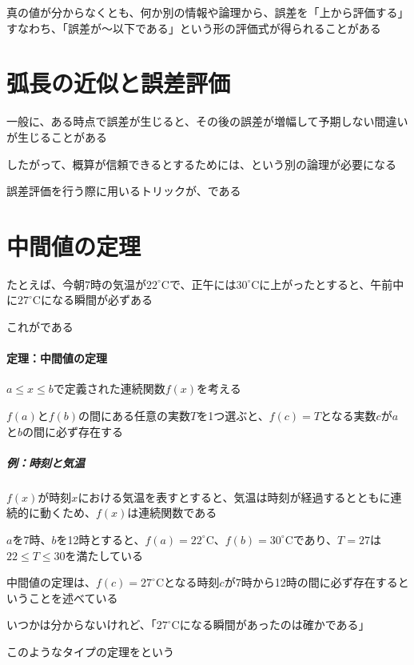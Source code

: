\documentclass[../book_jiriki_calc]{subfiles}
\begin{document}
\sectionline

真の値が分からなくとも、何か別の情報や論理から、誤差を「上から評価する」すなわち、「誤差が〜以下である」という形の評価式が得られることがある

\section{弧長の近似と誤差評価}

一般に、ある時点で誤差が生じると、その後の誤差が増幅して予期しない間違いが生じることがある

したがって、概算が信頼できるとするためには、という別の論理が必要になる

誤差評価を行う際に用いるトリックが、である

\section{中間値の定理}

たとえば、今朝7時の気温が$22^\circ$Cで、正午には$30^\circ$Cに上がったとすると、午前中に$27^\circ$Cになる瞬間が必ずある

これがである

\sectionline

\paragraph{定理：中間値の定理}

$a \leq x \leq b$で定義された連続関数$f(x)$を考える

$f(a)$と$f(b)$の間にある任意の実数$T$を1つ選ぶと、$f(c)=T$となる実数$c$が$a$と$b$の間に必ず存在する

\sectionline

\subparagraph{例：時刻と気温}

$f(x)$が時刻$x$における気温を表すとすると、気温は時刻が経過するとともに連続的に動くため、$f(x)$は連続関数である

$a$を7時、$b$を12時とすると、$f(a)=22^\circ$C、$f(b)=30^\circ$Cであり、$T=27$は$22\leq T\leq 30$を満たしている

中間値の定理は、$f(c)=27^\circ$Cとなる時刻$c$が7時から12時の間に必ず存在するということを述べている

\sectionline

いつかは分からないけれど、「$27^\circ$Cになる瞬間があったのは確かである」

このようなタイプの定理をという
\end{document}
